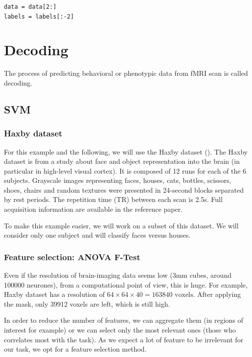 \documentclass{frontiersSCNS} %
\begin{document}
\begin{lstlisting}
data = data[2:]
labels = labels[:-2]
\end{lstlisting}

\section{Decoding}

The process of predicting behavioral or phenotypic data from fMRI scan is
called decoding.


\subsection{SVM}



\subsubsection{Haxby dataset}

For this example and the following, we will use the Haxby dataset
(\cite{haxby2001}).
The Haxby dataset is from a study about face and object representation into the
brain (in particular in high-level visual cortex). It is composed of 12 runs for
each of the 6 subjects. Grayscale images representing faces, houses, cats,
bottles, scissors, shoes, chairs and random textures were presented in
24-second blocks separated by rest periods. The repetition time (TR) between each
scan is 2.5s. Full acquisition information are available in the reference paper.

To make this example easier, we will work on a subset of this dataset. We will
consider only one subject and will classify faces versus houses.

\subsubsection{Feature selection: ANOVA F-Test}

Even if the resolution of brain-imaging data seems low (3mm cubes, around 100000
neurones), from a computational point of view, this is huge. For example,
Haxby dataset has a resolution of $64\times64\times40 = 163840\text{ voxels}$.
After applying the mask, only 39912 voxels are left, which is still high.

In order to reduce the number of features, we can aggregate them (in regions of
interest for example) or we can select only the most relevant ones (those who
correlates most with the task). As we expect a lot of feature to be irrelevant
for our task, we opt for a feature selection method.
\end{document}
